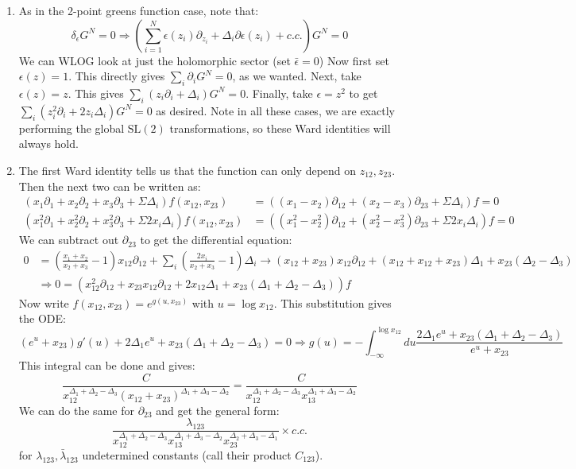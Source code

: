 \documentclass[11pt]{article}
\begin{document}
\begin{enumerate}
	\item As in the 2-point greens function case, note that:
	\[
		\delta_{\epsilon} G^N = 0 \Rightarrow \left(\sum_{i=1}^N \epsilon(z_i) \partial_{z_i} + \Delta_i \partial \epsilon(z_i) + c.c. \right) G^N = 0
	\]
	We can WLOG look at just the holomorphic sector (set $\bar \epsilon = 0$) Now first set $\epsilon(z) = 1$. This directly gives $\sum_{i} \partial_i G^N = 0$, as we wanted. Next, take $\epsilon(z)= z$. This gives $\sum_{i} (z_i \partial_i + \Delta_i) G^N = 0$. Finally, take $\epsilon = z^2$ to get $\sum_i (z^2_i \partial_i + 2 z_i \Delta_i) G^N = 0$ as desired. 
	Note in all these cases, we are exactly performing the global $\mathrm{SL}(2)$ transformations, so these Ward identities will always hold. 
	
	\item The first Ward identity tells us that the function can only depend on $z_{12}, z_{23}$. Then the next two can be written as:
	\[
		\begin{aligned}
			(x_1 \partial_1 + x_2 \partial_2 + x_3 \partial_3 + \Sigma \Delta_i) f(x_{12}, x_{23}) &= \left( (x_1 - x_2) \partial_{12} + (x_2 - x_3) \partial_{23} + \Sigma \Delta_i \right) f = 0\\
			(x_1^2 \partial_1 + x_2^2 \partial_2 + x_3^2 \partial_3 + \Sigma 2 x_i \Delta_i) f(x_{12}, x_{23}) &= \left( (x_1^2 - x_2^2) \partial_{12} + (x_2^2 - x_3^2) \partial_{23} + \Sigma 2 x_i \Delta_i \right) f = 0
		\end{aligned}
	\]
	We can subtract out $\partial_{23}$ to get the differential equation:
	\[
	\begin{aligned}
		0 &= \left( \frac{x_1 + x_2}{x_2 + x_3} - 1 \right) x_{12} \partial_{12} + \sum_i \left( \frac{2 x_i}{x_2 + x_3} - 1 \right) \Delta_i \to (x_{12} + x_{23}) x_{12} \partial_{12} + (x_{12} + x_{12} + x_{23}) \Delta_1  + x_{23} (\Delta_2 - \Delta_3)\\
		& \Rightarrow 0 = \left(x_{12}^2 \partial_{12} + x_{23} x_{12} \partial_{12} + 2 x_{12} \Delta_{1} + x_{23} (\Delta_1 + \Delta_2 - \Delta_3) \right) f
	\end{aligned}
	\]
	Now write $f(x_{12}, x_{23}) = e^{g(u, x_{23})}$ with $u = \log x_{12}$. This substitution gives the ODE:
	\[
		(e^u + x_{23}) g'(u) + 2 \Delta_1 e^u + x_{23} (\Delta_1 + \Delta_2 - \Delta_3) = 0 \Rightarrow g(u) = -\int_{-\infty}^{\log{x_{12}}} du \frac{2 \Delta_1 e^u + x_{23} (\Delta_1 + \Delta_2 - \Delta_3)}{e^{u} + x_{23}}
	\]
	This integral can be done and gives:
	\[
		\frac{C}{x_{12}^{\Delta_1 + \Delta_2 - \Delta_3} (x_{12} + x_{23})^{\Delta_1 + \Delta_3 - \Delta_2}} = \frac{C}{x_{12}^{\Delta_1 + \Delta_2 - \Delta_3} x_{13}^{\Delta_1 + \Delta_3 - \Delta_2}} 
	\]
	We can do the same for $\partial_{23}$ and get the general form:
	\[
		\frac{\lambda_{123}}{x_{12}^{\Delta_1 + \Delta_2 - \Delta_3} x_{13}^{\Delta_1 + \Delta_3 - \Delta_2} x_{23}^{\Delta_2 + \Delta_3 - \Delta_1}} \times c.c.
	\]
	for $\lambda_{123}, \bar \lambda_{123}$ undetermined constants (call their product $C_{123}$). 
	

\end{enumerate}
\end{document}
